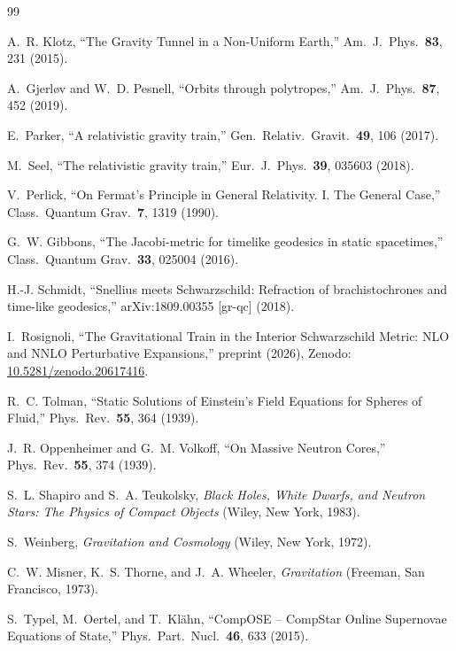 \documentclass[
  aps,
  prd,
  twocolumn,
  nofootinbib,
  superscriptaddress,
  longbibliography
]{revtex4-2}
\begin{document}
\begin{thebibliography}{99}

A.~R. Klotz,
``The Gravity Tunnel in a Non-Uniform Earth,''
Am.\ J.\ Phys.\ \textbf{83}, 231 (2015).

A.~Gjerl\o{}v and W.~D. Pesnell,
``Orbits through polytropes,''
Am.\ J.\ Phys.\ \textbf{87}, 452 (2019).

E.~Parker,
``A relativistic gravity train,''
Gen.\ Relativ.\ Gravit.\ \textbf{49}, 106 (2017).

M.~Seel,
``The relativistic gravity train,''
Eur.\ J.\ Phys.\ \textbf{39}, 035603 (2018).

V.~Perlick,
``On Fermat's Principle in General Relativity. I. The General Case,''
Class.\ Quantum Grav.\ \textbf{7}, 1319 (1990).

G.~W. Gibbons,
``The Jacobi-metric for timelike geodesics in static spacetimes,''
Class.\ Quantum Grav.\ \textbf{33}, 025004 (2016).

H.-J. Schmidt,
``Snellius meets Schwarzschild: Refraction of brachistochrones and
time-like geodesics,''
arXiv:1809.00355 [gr-qc] (2018).

I.~Rosignoli,
``The Gravitational Train in the Interior Schwarzschild Metric:
NLO and NNLO Perturbative Expansions,''
preprint (2026), Zenodo:
\href{https://doi.org/10.5281/zenodo.20617416}{10.5281/zenodo.20617416}.

R.~C. Tolman,
``Static Solutions of Einstein's Field Equations for Spheres of Fluid,''
Phys.\ Rev.\ \textbf{55}, 364 (1939).

J.~R. Oppenheimer and G.~M. Volkoff,
``On Massive Neutron Cores,''
Phys.\ Rev.\ \textbf{55}, 374 (1939).

S.~L. Shapiro and S.~A. Teukolsky,
\textit{Black Holes, White Dwarfs, and Neutron Stars:
The Physics of Compact Objects}
(Wiley, New York, 1983).

S.~Weinberg,
\textit{Gravitation and Cosmology}
(Wiley, New York, 1972).

C.~W. Misner, K.~S. Thorne, and J.~A. Wheeler,
\textit{Gravitation}
(Freeman, San Francisco, 1973).

S.~Typel, M.~Oertel, and T.~Kl\"{a}hn,
``{CompOSE} -- {CompStar} Online Supernovae Equations of State,''
Phys.\ Part.\ Nucl.\ \textbf{46}, 633 (2015).


\end{thebibliography}
\end{document}
